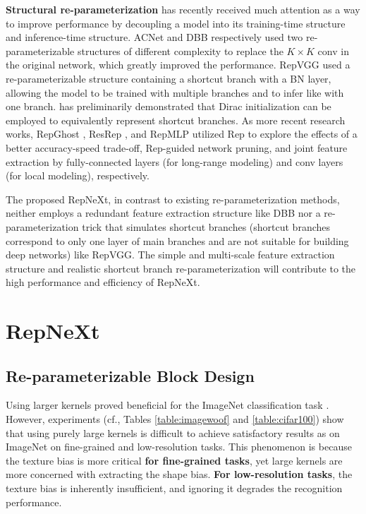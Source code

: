 \documentclass[preprint,12pt]{elsarticle}
\begin{document}
\textbf{Structural re-parameterization} has recently received much attention as a way to improve performance by decoupling a model into its training-time structure and inference-time structure. ACNet \cite{acnet} and DBB \cite{dbb} respectively used two re-parameterizable structures of different complexity to replace the $K \times K$ conv in the original network, which greatly improved the performance. RepVGG \cite{repvgg} used a re-parameterizable structure containing a shortcut branch with a BN layer, allowing the model to be trained with multiple branches and to infer like with one branch. \cite{rmnet} has preliminarily demonstrated that Dirac initialization can be employed to equivalently represent shortcut branches. As more recent research works, RepGhost \cite{repghost}, ResRep \cite{resrep}, and RepMLP \cite{repmlp} utilized Rep to explore the effects of a better accuracy-speed trade-off, Rep-guided network pruning, and joint feature extraction by fully-connected layers (for long-range modeling) and conv layers (for local modeling), respectively.

The proposed RepNeXt, in contrast to existing re-parameterization methods, neither employs a redundant feature extraction structure like DBB nor a re-parameterization trick that simulates shortcut branches (shortcut branches correspond to only one layer of main branches and are not suitable for building deep networks) like RepVGG. The simple and multi-scale feature extraction structure and realistic shortcut branch re-parameterization will contribute to the high performance and efficiency of RepNeXt.

\section{RepNeXt}
\label{sec:repnext}

\subsection{Re-parameterizable Block Design}
\label{sec:3-1}

Using larger kernels proved beneficial for the ImageNet classification task \cite{replknet}. However, experiments (cf., Tables \ref{table:imagewoof} and \ref{table:cifar100}) show that using purely large kernels is difficult to achieve satisfactory results as on ImageNet on fine-grained and low-resolution tasks. This phenomenon is because the texture bias is more critical \textbf{for fine-grained tasks}, yet large kernels are more concerned with extracting the shape bias. \textbf{For low-resolution tasks}, the texture bias is inherently insufficient, and ignoring it degrades the recognition performance.
\end{document}
